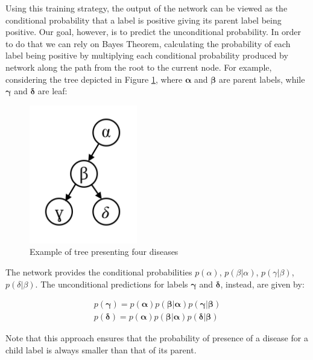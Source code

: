 Using this training strategy, the output of the network can be viewed as the conditional probability that a label is positive giving its parent label being positive. Our goal, however, is to predict the unconditional probability. In order to do that we can rely on Bayes Theorem, calculating the probability of each label being positive by multiplying each conditional probability produced by network along the path from the root to the current node.
For example, considering the tree depicted in Figure \ref{fig:figure_4.4}, where $\boldsymbol{\alpha}$ and $\boldsymbol{\beta}$ are parent labels, while  $\boldsymbol{\gamma}$  and  $\boldsymbol{\delta}$ are leaf:

\newpage

\begin{figure}[htbp!]
\centering

\includegraphics[scale=0.5]{Tesi/images/CT_inference.png}
\caption{Example of tree presenting four diseases}
\label{fig:figure_4.4}
\end{figure}

\noindent The network provides the conditional probabilities $p(\alpha)$, $p(\beta|\alpha)$, $p(\gamma|\beta)$, $p(\delta|\beta)$. The unconditional predictions for labels $\boldsymbol{\gamma}$  and  $\boldsymbol{\delta}$, instead, are given by: 

\begin{equation}
\begin{split}
    p(\boldsymbol{\gamma}) = p(\boldsymbol{\alpha})p(\boldsymbol{\beta}|\boldsymbol{\alpha})p(\boldsymbol{\gamma}|\boldsymbol{\beta})\\[7pt]
 p(\boldsymbol{\delta}) = p(\boldsymbol{\alpha})p(\boldsymbol{\beta}|\boldsymbol{\alpha})p(\boldsymbol{\delta}|\boldsymbol{\beta})
 \end{split}
    \label{eq:eq_4.4}
\end{equation}

\noindent Note that this approach ensures that the probability of presence of a disease for a child label is always smaller than that of its parent.

